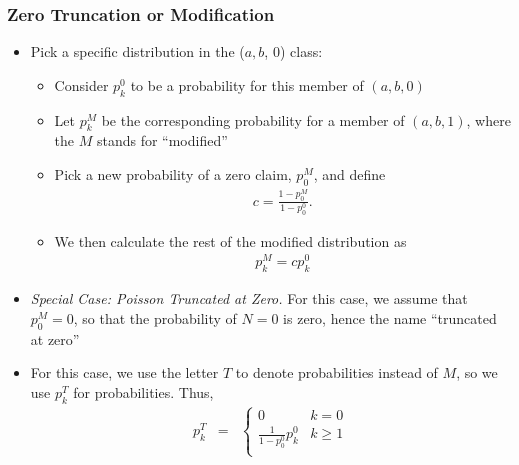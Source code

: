 \documentclass{beamer}
\begin{document}
 \begin{frame}%
 \frametitle{Zero Truncation or Modification}
\begin{itemize}
\item Pick a specific distribution in the ($a, b$, 0) class: \vspace{2mm}
\begin{itemize}
\item Consider $p_k^0$ to be a probability for this member of $(a,b,0)$
\item Let $p_k^M$ be the corresponding probability for a member of $(a,b,1)$, where the $M$ stands for ``modified''
\item Pick a new probability of a zero claim, $p_0^M$, and define
\begin{eqnarray*}
c = \frac{1-p_0^M}{1-p_0^0} .
\end{eqnarray*} %
\item We then calculate the rest of the modified distribution as
\begin{eqnarray*}
p_k^M =c p_k^0
\end{eqnarray*} %
 \end{itemize}
 \item \textit{Special Case: Poisson Truncated at Zero.} For this case, we assume that $p_0^M=0$, so that the probability of $N=0$ is zero, hence the name ``truncated at zero'' %
  \item For this case, we use the letter $T$ to denote probabilities instead of $M$, so we use $p_k^T$ for probabilities. Thus,
\begin{eqnarray*}
p_k^T&=&
\left \{
\begin{array}{cc}
0 & k=0\\ \frac{1}{1-p_0^0}p_k^0 & k \ge 1\\
\end{array}
\right.
\end{eqnarray*}
 \end{itemize}
\end{frame}
\end{document}
